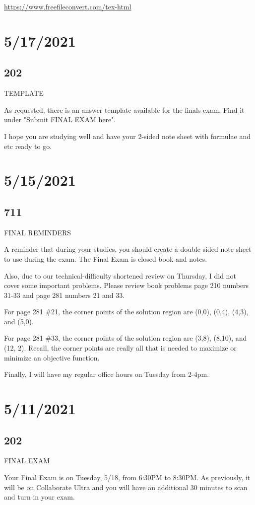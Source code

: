 \documentclass[]{article}
\begin{document}
	
\url{https://www.freefileconvert.com/tex-html}

\section*{5/17/2021}
\subsection*{202}
TEMPLATE

As requested, there is an answer template available for the finals exam. Find it under "Submit FINAL EXAM here".

I hope you are studying well and have your 2-sided note sheet with formulae and etc ready to go.

\section*{5/15/2021}
\subsection*{711}
FINAL REMINDERS

A reminder that during your studies, you should create a double-sided note sheet to use during the exam. The Final Exam is closed book and notes.

Also, due to our technical-difficulty shortened review on Thursday, I did not cover some important problems. Please review book problems page 210 numbers 31-33 and page 281 numbers 21 and 33.

For page 281 \#21, the corner points of the solution region are (0,0), (0,4), (4,3), and (5,0).

For page 281 \#33, the corner points of the solution region are (3,8), (8,10), and (12, 2). Recall, the corner points are really all that is needed to maximize or minimize an objective function.

Finally, I will have my regular office hours on Tuesday from 2-4pm.


\section*{5/11/2021}
\subsection*{202}
FINAL EXAM

Your Final Exam is on Tuesday, 5/18, from 6:30PM to 8:30PM. As previously, it will be on Collaborate Ultra and you will have an additional 30 minutes to scan and turn in your exam.
\end{document}
